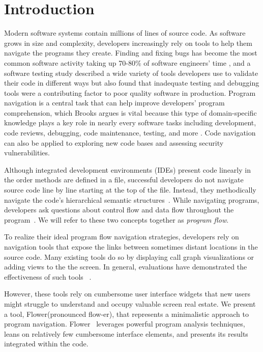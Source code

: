 \documentclass[conference]{IEEEtran}
\newcommand{\toolName}{Flower}
\begin{document}



\IEEEpeerreviewmaketitle


\section{Introduction}
Modern software systems contain millions of lines of source code. 
As software grows in size and complexity, developers increasingly rely on tools to help them navigate the programs they create. Finding and fixing bugs has become the most common software activity taking up 70-80\% of software engineers' time \cite{Whyline}, and a software testing study described a wide variety of tools developers use to validate their code in different ways but also found that inadequate testing and debugging tools were a contributing factor to poor quality software in production\cite{NIST-02-3}.
Program navigation is a central task that can help improve developers' program comprehension, which Brooks argues is vital because this type of domain-specific knowledge plays a key role in nearly every software tasks including development, code reviews, debugging, code maintenance, testing, and more \cite{BrooksComprehension}. Code navigation can also be applied to exploring new code bases and assessing security vulnerabilities. 

Although integrated development environments (IDEs) present code linearly in the order methods are defined in a file, successful developers do not navigate source code line by line starting at the top of the file. 
Instead, they methodically navigate the code's hierarchical semantic structures~\cite{robillard2004investigate}.
While navigating programs, developers ask questions about control flow and data flow throughout the program~\cite{latoza2010hard, Smith2015}. 
We will refer to these two concepts together as \textit{program flow}. 

To realize their ideal program flow navigation strategies, developers rely on navigation tools that expose the links between sometimes distant locations in the source code. 
Many existing tools do so by displaying call graph visualizations or adding views to the the screen.
In general, evaluations have demonstrated the effectiveness of such tools ~\cite{Reacher,Whyline,Relo,Stacksplorer}.

However, these tools rely on cumbersome user interface widgets that new users might struggle to understand and occupy valuable screen real estate.
We present a tool, \toolName (pronounced flow-er), that represents a minimalistic approach to program navigation.
\toolName~ leverages powerful program analysis techniques, leans on relatively few cumbersome interface elements, and presents its results integrated within the code.
\end{document}
